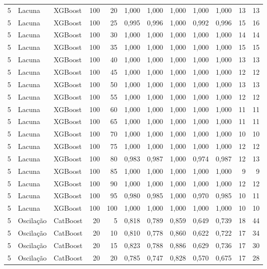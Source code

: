 \begin{longtable}{@{}rllrrrrrrrrr@{}}
5 & Lacuna & XGBoost & 100 & 20 & 1,000 & 1,000 & 1,000 & 1,000 & 1,000 & 13 & 13 \\
5 & Lacuna & XGBoost & 100 & 25 & 0,995 & 0,996 & 1,000 & 0,992 & 0,996 & 15 & 16 \\
5 & Lacuna & XGBoost & 100 & 30 & 1,000 & 1,000 & 1,000 & 1,000 & 1,000 & 14 & 14 \\
5 & Lacuna & XGBoost & 100 & 35 & 1,000 & 1,000 & 1,000 & 1,000 & 1,000 & 15 & 15 \\
5 & Lacuna & XGBoost & 100 & 40 & 1,000 & 1,000 & 1,000 & 1,000 & 1,000 & 13 & 13 \\
5 & Lacuna & XGBoost & 100 & 45 & 1,000 & 1,000 & 1,000 & 1,000 & 1,000 & 12 & 12 \\
5 & Lacuna & XGBoost & 100 & 50 & 1,000 & 1,000 & 1,000 & 1,000 & 1,000 & 13 & 13 \\
5 & Lacuna & XGBoost & 100 & 55 & 1,000 & 1,000 & 1,000 & 1,000 & 1,000 & 12 & 12 \\
5 & Lacuna & XGBoost & 100 & 60 & 1,000 & 1,000 & 1,000 & 1,000 & 1,000 & 11 & 11 \\
5 & Lacuna & XGBoost & 100 & 65 & 1,000 & 1,000 & 1,000 & 1,000 & 1,000 & 11 & 11 \\
5 & Lacuna & XGBoost & 100 & 70 & 1,000 & 1,000 & 1,000 & 1,000 & 1,000 & 10 & 10 \\
5 & Lacuna & XGBoost & 100 & 75 & 1,000 & 1,000 & 1,000 & 1,000 & 1,000 & 12 & 12 \\
5 & Lacuna & XGBoost & 100 & 80 & 0,983 & 0,987 & 1,000 & 0,974 & 0,987 & 12 & 13 \\
5 & Lacuna & XGBoost & 100 & 85 & 1,000 & 1,000 & 1,000 & 1,000 & 1,000 & 9 & 9 \\
5 & Lacuna & XGBoost & 100 & 90 & 1,000 & 1,000 & 1,000 & 1,000 & 1,000 & 12 & 12 \\
5 & Lacuna & XGBoost & 100 & 95 & 0,980 & 0,985 & 1,000 & 0,970 & 0,985 & 10 & 11 \\
5 & Lacuna & XGBoost & 100 & 100 & 1,000 & 1,000 & 1,000 & 1,000 & 1,000 & 10 & 10 \\
5 & Oscilação & CatBoost & 20 & 5 & 0,818 & 0,789 & 0,859 & 0,649 & 0,739 & 18 & 44 \\
5 & Oscilação & CatBoost & 20 & 10 & 0,810 & 0,778 & 0,860 & 0,622 & 0,722 & 17 & 34 \\
5 & Oscilação & CatBoost & 20 & 15 & 0,823 & 0,788 & 0,886 & 0,629 & 0,736 & 17 & 30 \\
5 & Oscilação & CatBoost & 20 & 20 & 0,785 & 0,747 & 0,828 & 0,570 & 0,675 & 17 & 28 \\

\end{longtable}

